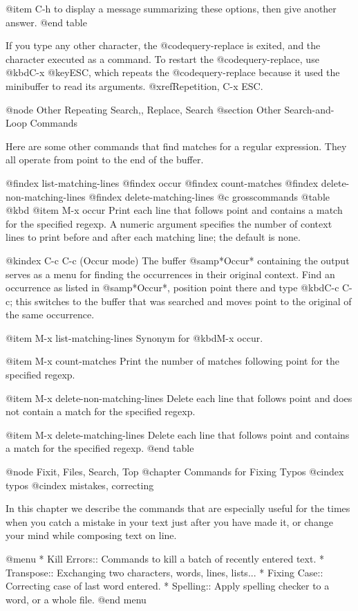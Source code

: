 {{{{{{{{{{{{{{{{{{{{@item C-h
to display a message summarizing these options, then give another
answer.
@end table

  If you type any other character, the @code{query-replace} is exited, and
the character executed as a command.  To restart the @code{query-replace},
use @kbd{C-x @key{ESC}}, which repeats the @code{query-replace} because it
used the minibuffer to read its arguments.  @xref{Repetition, C-x ESC}.

@node Other Repeating Search,, Replace, Search
@section Other Search-and-Loop Commands

  Here are some other commands that find matches for a regular expression.
They all operate from point to the end of the buffer.

@findex list-matching-lines
@findex occur
@findex count-matches
@findex delete-non-matching-lines
@findex delete-matching-lines
@c grosscommands
@table @kbd
@item M-x occur
Print each line that follows point and contains a match for the
specified regexp.  A numeric argument specifies the number of context
lines to print before and after each matching line; the default is
none.

@kindex C-c C-c (Occur mode)
The buffer @samp{*Occur*} containing the output serves as a menu for
finding the occurrences in their original context.  Find an occurrence
as listed in @samp{*Occur*}, position point there and type @kbd{C-c
C-c}; this switches to the buffer that was searched and moves point to
the original of the same occurrence.

@item M-x list-matching-lines
Synonym for @kbd{M-x occur}.

@item M-x count-matches
Print the number of matches following point for the specified regexp.

@item M-x delete-non-matching-lines
Delete each line that follows point and does not contain a match for
the specified regexp.

@item M-x delete-matching-lines
Delete each line that follows point and contains a match for the
specified regexp.
@end table

@node Fixit, Files, Search, Top
@chapter Commands for Fixing Typos
@cindex typos
@cindex mistakes, correcting

  In this chapter we describe the commands that are especially useful for
the times when you catch a mistake in your text just after you have made
it, or change your mind while composing text on line.

@menu
* Kill Errors:: Commands to kill a batch of recently entered text.
* Transpose::   Exchanging two characters, words, lines, lists...
* Fixing Case:: Correcting case of last word entered.
* Spelling::    Apply spelling checker to a word, or a whole file.
@end menu

}}}}}}}}}}}}}}}}}}}}
